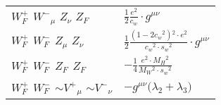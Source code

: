 \begin{center}
\begin{tabular}{|l|l|}
$W^+_F{}_{}$ \phantom{-} $W^-{}_{\mu }$ \phantom{-} ${Z}_{\nu }$ \phantom{-} $Z_F{}_{}$ \phantom{-}  &
	$\frac{1}{2}\frac{ e{}^2 }{ c_w}\cdot g^{\mu \nu} $\\[2mm]
$W^+_F{}_{}$ \phantom{-} $W^-_F{}_{}$ \phantom{-} ${Z}_{\mu }$ \phantom{-} ${Z}_{\nu }$ \phantom{-}  &
	$\frac{1}{2}\frac{ (1-2 c_w {}^2){}^2  \cdot e{}^2 }{ c_w{}^2  \cdot s_w{}^2 }\cdot g^{\mu \nu} $\\[2mm]
$W^+_F{}_{}$ \phantom{-} $W^-_F{}_{}$ \phantom{-} $Z_F{}_{}$ \phantom{-} $Z_F{}_{}$ \phantom{-}  &
	$-\frac{1}{4}\frac{ e{}^2  \cdot M_H{}^2 }{ M_W{}^2  \cdot s_w{}^2 }$\\[2mm]
$W^+_F{}_{}$ \phantom{-} $W^-_F{}_{}$ \phantom{-} $\sim V^+{}_{\mu }$ \phantom{-} $\sim V^-{}_{\nu }$ \phantom{-}  &
	$-g^{\mu \nu} \big( \lambda_2+ \lambda_3\big)$\\ \hline
\end{tabular}


\end{center}
